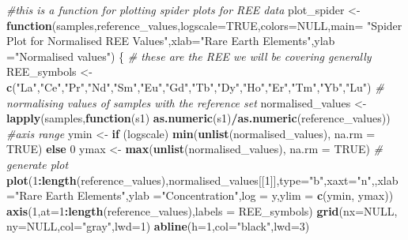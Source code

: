 \documentclass[
]{article}
\newenvironment{Shaded}{\begin{snugshade}}{\end{snugshade}}
\newcommand{\AttributeTok}[1]{\textcolor[rgb]{0.13,0.29,0.53}{#1}}
\newcommand{\CommentTok}[1]{\textcolor[rgb]{0.56,0.35,0.01}{\textit{#1}}}
\newcommand{\ConstantTok}[1]{\textcolor[rgb]{0.56,0.35,0.01}{#1}}
\newcommand{\ControlFlowTok}[1]{\textcolor[rgb]{0.13,0.29,0.53}{\textbf{#1}}}
\newcommand{\DecValTok}[1]{\textcolor[rgb]{0.00,0.00,0.81}{#1}}
\newcommand{\FunctionTok}[1]{\textcolor[rgb]{0.13,0.29,0.53}{\textbf{#1}}}
\newcommand{\NormalTok}[1]{#1}
\newcommand{\OtherTok}[1]{\textcolor[rgb]{0.56,0.35,0.01}{#1}}
\newcommand{\SpecialCharTok}[1]{\textcolor[rgb]{0.81,0.36,0.00}{\textbf{#1}}}
\newcommand{\StringTok}[1]{\textcolor[rgb]{0.31,0.60,0.02}{#1}}
\begin{document}
\begin{Shaded}
\begin{Highlighting}[]
\CommentTok{\#this is a function for plotting spider plots for REE data}
\NormalTok{plot\_spider }\OtherTok{\textless{}{-}} \ControlFlowTok{function}\NormalTok{(samples,reference\_values,}\AttributeTok{logscale=}\ConstantTok{TRUE}\NormalTok{,}\AttributeTok{colors=}\ConstantTok{NULL}\NormalTok{,}\AttributeTok{main=} \StringTok{"Spider Plot for Normalised REE Values"}\NormalTok{,}\AttributeTok{xlab=}\StringTok{"Rare Earth Elements"}\NormalTok{,}\AttributeTok{ylab =}\StringTok{"Normalised values"}\NormalTok{)}
\NormalTok{\{}
  \CommentTok{\# these are the REE we will be covering generally}
\NormalTok{  REE\_symbols }\OtherTok{\textless{}{-}}  \FunctionTok{c}\NormalTok{(}\StringTok{"La"}\NormalTok{,}\StringTok{"Ce"}\NormalTok{,}\StringTok{"Pr"}\NormalTok{,}\StringTok{"Nd"}\NormalTok{,}\StringTok{"Sm"}\NormalTok{,}\StringTok{"Eu"}\NormalTok{,}\StringTok{"Gd"}\NormalTok{,}\StringTok{"Tb"}\NormalTok{,}\StringTok{"Dy"}\NormalTok{,}\StringTok{"Ho"}\NormalTok{,}\StringTok{"Er"}\NormalTok{,}\StringTok{"Tm"}\NormalTok{,}\StringTok{"Yb"}\NormalTok{,}\StringTok{"Lu"}\NormalTok{)}
  \CommentTok{\# normalising values of samples with the reference set}
\NormalTok{  normalised\_values }\OtherTok{\textless{}{-}} \FunctionTok{lapply}\NormalTok{(samples,}\ControlFlowTok{function}\NormalTok{(s1) }\FunctionTok{as.numeric}\NormalTok{(s1)}\SpecialCharTok{/}\FunctionTok{as.numeric}\NormalTok{(reference\_values))}
  \CommentTok{\#axis range}
\NormalTok{  ymin }\OtherTok{\textless{}{-}} \ControlFlowTok{if}\NormalTok{ (logscale) }\FunctionTok{min}\NormalTok{(}\FunctionTok{unlist}\NormalTok{(normalised\_values), }\AttributeTok{na.rm =} \ConstantTok{TRUE}\NormalTok{) }\ControlFlowTok{else} \DecValTok{0}
\NormalTok{  ymax }\OtherTok{\textless{}{-}} \FunctionTok{max}\NormalTok{(}\FunctionTok{unlist}\NormalTok{(normalised\_values), }\AttributeTok{na.rm =} \ConstantTok{TRUE}\NormalTok{)}
  \CommentTok{\# generate plot }
  \FunctionTok{plot}\NormalTok{(}\DecValTok{1}\SpecialCharTok{:}\FunctionTok{length}\NormalTok{(reference\_values),normalised\_values[[}\DecValTok{1}\NormalTok{]],}\AttributeTok{type=}\StringTok{"b"}\NormalTok{,}\AttributeTok{xaxt=}\StringTok{"n"}\NormalTok{,,}\AttributeTok{xlab=}\StringTok{"Rare Earth Elements"}\NormalTok{,}\AttributeTok{ylab =}\StringTok{"Concentration"}\NormalTok{,}\AttributeTok{log =} \StringTok{\textquotesingle{}y\textquotesingle{}}\NormalTok{,}\AttributeTok{ylim =} \FunctionTok{c}\NormalTok{(ymin, ymax))}
  \FunctionTok{axis}\NormalTok{(}\DecValTok{1}\NormalTok{,}\AttributeTok{at=}\DecValTok{1}\SpecialCharTok{:}\FunctionTok{length}\NormalTok{(reference\_values),}\AttributeTok{labels =}\NormalTok{ REE\_symbols)}
  \FunctionTok{grid}\NormalTok{(}\AttributeTok{nx=}\ConstantTok{NULL}\NormalTok{, }\AttributeTok{ny=}\ConstantTok{NULL}\NormalTok{,}\AttributeTok{col=}\StringTok{"gray"}\NormalTok{,}\AttributeTok{lwd=}\DecValTok{1}\NormalTok{)}
  \FunctionTok{abline}\NormalTok{(}\AttributeTok{h=}\DecValTok{1}\NormalTok{,}\AttributeTok{col=}\StringTok{"black"}\NormalTok{,}\AttributeTok{lwd=}\DecValTok{3}\NormalTok{)}
  

\end{Highlighting}
\end{Shaded}
\end{document}
